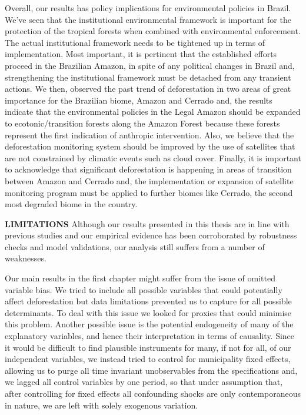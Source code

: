 Overall, our results has policy implications for environmental policies in Brazil. We've seen that the institutional environmental framework is important for the protection of the tropical forests when combined with environmental enforcement. The actual institutional framework needs to be tightened up in terms of implementation. Most important, it is pertinent that the established efforts proceed in the Brazilian Amazon, in spite of any political changes in Brazil and, strengthening the institutional framework must be detached from any transient actions. We then, observed the past trend of deforestation in two areas of great importance for the Brazilian biome, Amazon and Cerrado and, the results indicate that the environmental policies in the Legal Amazon should be expanded to ecotonic/transition forests along the Amazon Forest because these forests represent the first indication of anthropic intervention. Also, we believe that the deforestation monitoring system should be improved by the use of satellites that are not constrained by climatic events such as cloud cover. Finally, it is important to acknowledge that significant deforestation is happening in areas of transition between Amazon and Cerrado and, the implementation or expansion of satellite monitoring program must be applied to further biomes like Cerrado, the second most degraded biome in the country.

\textbf{LIMITATIONS} Although our results presented in this thesis are in line with previous studies and our empirical evidence has been corroborated by robustness checks and model validations, our analysis still suffers from a number of weaknesses. 


Our main results in the first chapter might suffer from the issue of omitted variable bias. We tried to include all possible variables that could potentially affect deforestation but data limitations prevented us to capture for all possible determinants. To deal with this issue we looked for proxies that could minimise this problem. Another possible issue is the potential endogeneity of many of the explanatory variables, and hence their interpretation in terms of causality.  Since it would be difficult to find plausible instruments for many, if not for all, of our independent variables, we instead tried to control for municipality fixed effects, allowing us to purge all time invariant unobservables from the specifications and, we lagged all control variables by one period, so that under assumption that, after controlling for fixed effects all confounding shocks are only contemporaneous in nature, we are left with solely exogenous variation.  


